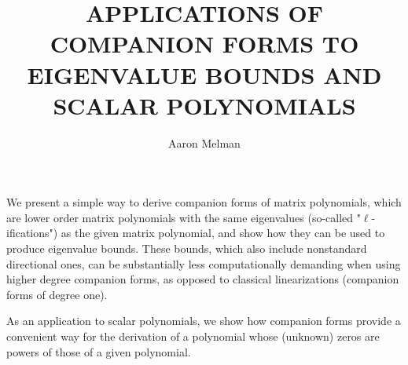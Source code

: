 \documentclass[a4paper]{amsart}
\date{}
\begin{document}
\title{APPLICATIONS OF COMPANION FORMS TO EIGENVALUE BOUNDS AND SCALAR POLYNOMIALS}
\author{Aaron Melman} %
\address{Santa Clara University} %

\maketitle


We present a simple way to derive companion forms of matrix polynomials, which are lower order matrix polynomials with the same eigenvalues 
(so-called "$\ell$-ifications") as the given matrix polynomial, and show how they can be used to produce eigenvalue bounds.
These bounds, which also include nonstandard directional ones, can be substantially less computationally demanding when using higher degree companion 
forms, as opposed to classical linearizations (companion forms of degree one).

As an application to scalar polynomials, we show how companion forms provide a convenient way for the derivation of a polynomial whose (unknown) zeros
are powers of those of a given polynomial.
\end{document}
